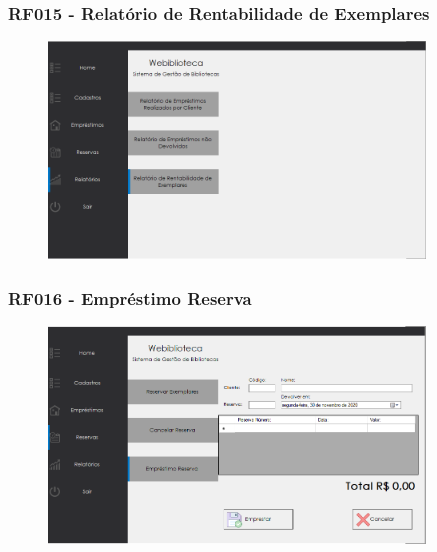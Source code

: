 \documentclass{beamer}
\begin{document}
\begin{frame}

\frametitle{RF015 - Relatório de Rentabilidade de Exemplares}
\begin{figure}[!ht]
\centering
\includegraphics[width=10cm]{codigo/img5.png}
\end{figure}

\end{frame}
\begin{frame}

\frametitle{RF016 - Empréstimo Reserva}
\begin{figure}[!ht]
\centering
\includegraphics[width=10cm]{codigo/img6.png}
\end{figure}

\end{frame}
\end{document}
